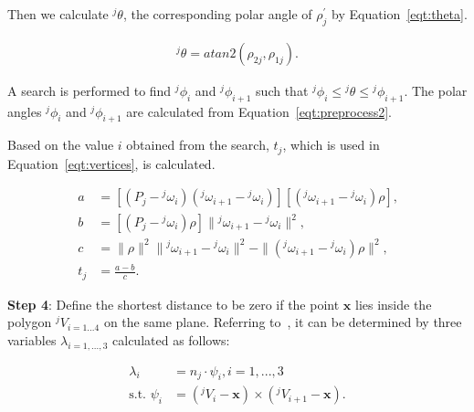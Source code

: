 Then we calculate ${^j\theta}$, the corresponding polar angle of $\rho^{\prime}_j$ by Equation~\ref{eqt:theta}.

\begin{equation}
\begin{aligned}
{^j\theta} = atan2 \left ( \rho_{2j},\rho_{1j} \right ) \mbox{.}
\end{aligned}
\label{eqt:theta}
\end{equation}

A search is performed to find ${^j\phi_i}$ and ${^j\phi_{i+1}}$ such that ${^j\phi_i} \leq {^j\theta} \leq {^j\phi_{i+1}}$.
The polar angles $^j\phi_i$ and ${^j\phi_{i+1}}$ are calculated from Equation~\ref{eqt:preprocess2}.


Based on the value $i$ obtained from the search, $t_j$, which is used in Equation~\ref{eqt:vertices}, is calculated.

\begin{equation}
\begin{aligned}
a &= [(P_j-{^j\omega}_i)({^j\omega}_{i+1}-{^j\omega}_i)][({^j\omega}_{i+1}-{^j\omega}_i)\rho] \mbox{,} \\
b &= [(P_j-{^j\omega}_i)\rho]\|{^j\omega}_{i+1}-{^j\omega}_i\|^2 \mbox{,} \\
c &= \|\rho\|^2\|{^j\omega}_{i+1}-{^j\omega}_i\|^2-\|({^j\omega}_{i+1}-{^j\omega}_i)\rho\|^2 \mbox{,} \\
t_j &= \frac{a-b}{c} \mbox{.}
\end{aligned}
\label{eqt:t}
\end{equation}

\noindent \textbf{Step 4}:
Define the shortest distance to be zero if the point $\boldsymbol{x}$ lies inside the polygon $^jV_{i=1...4}$ on the same plane.
Referring to~\cite{preparata85}, it can be determined by three variables $\lambda_{i=1,...,3}$ calculated as follows:

\begin{equation}
\begin{aligned}
\lambda_i &= n_j \cdot \psi_i, i={1,...,3} \\
\mbox{s.t. } \psi_i &= (^jV_i-\textbf{x}) \times (^jV_{i+1}-\textbf{x}) \mbox{.}
\end{aligned}
\label{eqt:lamda}
\end{equation}


